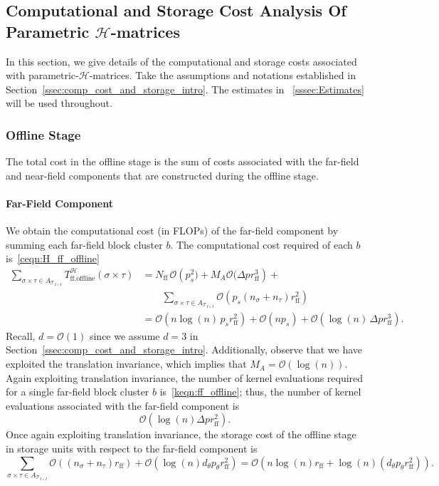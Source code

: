 \documentclass[final,3p,times]{elsarticle}
\newcommand{\mc}[1]{\mathcal{#1}}
\begin{document}
\subsection{Computational and Storage Cost Analysis Of  Parametric \texorpdfstring{$\mc{H}$}{}-matrices}\label{ssec:complexity_analysis_hmatrix}
In this section, we give details of the computational and storage costs  associated with parametric-$\mc{H}$-matrices. Take the assumptions and notations established in Section~\ref{ssec:comp_cost_and_storage_intro}. The estimates in ~\ref{sssec:Estimates} will be used throughout.
\subsubsection{Offline Stage}
The total cost in the offline stage is the sum of costs associated with the far-field and near-field components that are constructed during the offline stage. 
\paragraph{Far-Field Component} 
We obtain the computational cost (in FLOPs) of the far-field component by summing each far-field block cluster $b$. The computational cost required of each $b$ is~\eqref{ceqn:H_ff_offline} 
\begin{equation*}
\begin{aligned}
\sum_{\sigma \times \tau \in A_{\mc{T}_{I \times I}}}
    T^{\mc{H}}_{\text{ff}, \text{offline}}(\sigma \times \tau)
 &= N_{\text{ff}}\,\mc{O}\!\left(p_s^2)  + M_A \mc{O}(\Delta pr_{\text{ff}}^3 \right) 
 +  \\
 & \qquad 
      \sum_{\sigma \times \tau \in A_{\mc{T}_{I \times I}}} \mc{O}\!\left(p_s (n_{\sigma} + n_{\tau}) r_{\text{ff}}^2\right)\\
& = \mc{O}\!\left(n \log(n)\, p_s r_{\text{ff}}^2 \right) 
  + \mc{O}\!\left(n p_s\right) 
  + \mc{O}\!\left(\log(n)\, \Delta p r_{\text{ff}}^3\right).
\end{aligned}
\end{equation*}
Recall, $d = \mc{O}(1)$ since we assume $d = 3$ in Section~\ref{ssec:comp_cost_and_storage_intro}. Additionally, observe that we have exploited the translation invariance, which implies that $M_{A} = \mc{O}(\log(n))$.
Again exploiting translation invariance, the number of kernel evaluations required for a single far-field block cluster $b$ is~\eqref{keqn:ff_offline}; thus, the number of kernel evaluations associated with the far-field component is 
$$\mc{O}(\log(n)\Delta pr_{\text{ff}}^2).$$
Once again exploiting translation invariance, the storage cost of the offline stage in storage units with respect to the far-field component is 
$$
\sum_{\sigma \times \tau \in A_{\mc{T}_{I \times I}}}\mc{O}((n_{\sigma} + n_{\tau})r_{\text{ff}}) +\mc{O}(\log(n)d_{\theta}p_{\theta}r_{\text{ff}}^2) = \mc{O}(n\log(n)r_{\text{ff}} + \log(n)(d_{\theta}p_{\theta}r_{\text{ff}}^{2})).
$$
\end{document}
